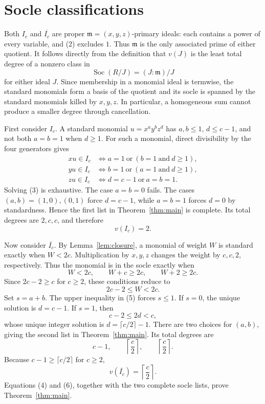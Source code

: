 \documentclass[11pt]{article}
\newcommand{\m}{\mathfrak m}
\newcommand{\Soc}{\operatorname{Soc}}
\begin{document}
\section{Socle classifications}

Both \(I_c\) and \(\overline{I_c}\) are proper \(\m=(x,y,z)\)-primary
ideals: each contains a power of every variable, and (2) excludes \(1\).
Thus \(\m\) is the only associated prime of either quotient.  It follows
directly from the definition that \(v(J)\) is the least total degree of a
nonzero class in
\[
 \Soc(R/J)=(J:\m)/J
\]
for either ideal \(J\).  Since membership in a monomial ideal is termwise,
the standard monomials form a basis of the quotient and its socle is spanned
by the standard monomials killed by \(x,y,z\).  In particular, a homogeneous
sum cannot produce a smaller degree through cancellation.

First consider \(I_c\).  A standard monomial \(u=x^ay^bz^d\) has
\(a,b\leq1\), \(d\leq c-1\), and not both \(a=b=1\) when \(d\geq1\).
For such a monomial, direct divisibility by the four generators gives
\begin{align*}
 xu\in I_c&\Longleftrightarrow a=1\ \text{or}\ (b=1\ \text{and}\ d\geq1),\\
 yu\in I_c&\Longleftrightarrow b=1\ \text{or}\ (a=1\ \text{and}\ d\geq1),\\
 zu\in I_c&\Longleftrightarrow d=c-1\ \text{or}\ a=b=1.\tag{3}
\end{align*}
Solving (3) is exhaustive.  The case \(a=b=0\) fails.  The cases
\((a,b)=(1,0),(0,1)\) force \(d=c-1\), while \(a=b=1\) forces \(d=0\)
by standardness.  Hence the first list in Theorem~\ref{thm:main} is complete.
Its total degrees are \(2,c,c\), and therefore
\[
 v(I_c)=2.\tag{4}
\]

Now consider \(\overline{I_c}\).  By Lemma~\ref{lem:closure}, a monomial
of weight \(W\) is standard exactly when \(W<2c\).  Multiplication by
\(x,y,z\) changes the weight by \(c,c,2\), respectively.  Thus the monomial
is in the socle exactly when
\[
 W<2c,\qquad W+c\geq2c,\qquad W+2\geq2c.
\]
Since \(2c-2\geq c\) for \(c\geq2\), these conditions reduce to
\[
 2c-2\leq W<2c.\tag{5}
\]
Set \(s=a+b\).  The upper inequality in (5) forces \(s\leq1\).  If
\(s=0\), the unique solution is \(d=c-1\).  If \(s=1\), then
\[
 c-2\leq2d<c,
\]
whose unique integer solution is
\(d=\lceil c/2\rceil-1\).  There are two choices for \((a,b)\), giving the
second list in Theorem~\ref{thm:main}.  Its total degrees are
\[
 c-1,\qquad \left\lceil\frac c2\right\rceil,
 \qquad \left\lceil\frac c2\right\rceil.
\]
Because \(c-1\geq\lceil c/2\rceil\) for \(c\geq2\),
\[
 v(\overline{I_c})=\left\lceil\frac c2\right\rceil.\tag{6}
\]
Equations (4) and (6), together with the two complete socle lists, prove
Theorem~\ref{thm:main}.
\end{document}
